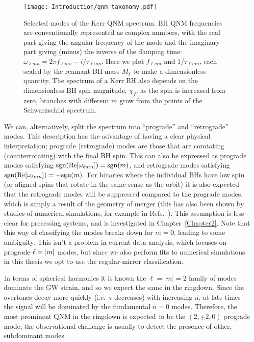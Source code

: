 \begin{figure}[t]
    \centering
    \texttt{[image: Introduction/qnm\_taxonomy.pdf]}
    \caption[Kerr quasinormal-mode spectrum]{ 
    Selected modes of the Kerr QNM spectrum. BH QNM frequencies are conventionally represented as complex numbers, with the real part giving the  angular frequency of the mode and the imaginary part giving (minus) the inverse of the damping time: $\omega_{\ell m n} = 2\pi f_{\ell m n} - i/\tau_{\ell m n}$. Here we plot $f_{\ell m n}$ and $1/\tau_{\ell m n}$, each scaled by the remnant BH mass $M_f$ to make a dimensionless quantity. The spectrum of a Kerr BH also depends on the dimensionless BH spin magnitude, $\chi_f$; as the spin is increased from zero, branches with different $m$ grow from the points of the Schwarzschild spectrum.
    }
    \label{ch1:fig:qnm_taxonomy}
\end{figure}

We can, alternatively, split the spectrum into ``prograde'' and ``retrograde'' modes. 
This description has the advantage of having a clear physical interpretation; prograde (retrograde) modes are those that are corotating (counterrotating) with the final BH spin.
This can also be expressed as prograde modes satisfying $\mathrm{sgn}\qty(\Re[\omega_{\ell m n}]) = \mathrm{sgn}\qty(m)$, and retrograde modes satisfying $\mathrm{sgn}\qty(\Re[\omega_{\ell m n}]) = -\mathrm{sgn}\qty(m)$.
For binaries where the individual BHs have low spin (or aligned spins that rotate in the same sense as the orbit) it is also expected that the retrograde modes will be suppressed compared to the prograde modes, which is simply a result of the geometry of merger (this has also been shown by studies of numerical simulations, for example in Refs.~\cite{Berti:2005ys, London:2014cma, JimenezForteza:2020cve}).
This assumption is less clear for precessing systems, and is investigated in Chapter~\ref{Chapter2}.
Note that this way of classifying the modes breaks down for $m=0$, leading to some ambiguity. 
This isn't a problem in current data analysis, which focuses on prograde $\ell = \abs{m}$ modes, but since we also perform fits to numerical simulations in this thesis we opt to use the regular-mirror classification.

In terms of spherical harmonics it is known the $\ell=|m|=2$ family of modes dominate the GW strain, and so we expect the same in the ringdown.
Since the overtones decay more quickly (i.e.\ $\tau$ decreases) with increasing $n$, at late times the signal will be dominated by the fundamental $n=0$ modes. 
Therefore, the most prominent QNM in the ringdown is expected to be the $(2,\pm 2,0)$ prograde mode; the observational challenge is usually to detect the presence of other, subdominant modes.

